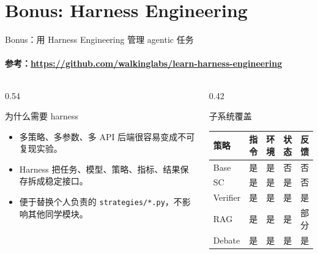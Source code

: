 \documentclass[10pt,aspectratio=169]{beamer}
\newcommand{\tightitems}{\setlength{\itemsep}{0.24em}}
\begin{document}
\section{Bonus: Harness Engineering}

\begin{frame}{Bonus：用 Harness Engineering 管理 agentic 任务}
  \framesubtitle{参考：\url{https://github.com/walkinglabs/learn-harness-engineering}}
  \begin{columns}[T,onlytextwidth]
    \begin{column}{0.54\textwidth}
      \begin{block}{为什么需要 harness}
        \begin{itemize}
          \tightitems
          \item 多策略、多参数、多 API 后端很容易变成不可复现实验。
          \item Harness 把任务、模型、策略、指标、结果保存拆成稳定接口。
          \item 便于替换个人负责的 \texttt{strategies/*.py}，不影响其他同学模块。
        \end{itemize}
      \end{block}
    \end{column}
    \begin{column}{0.42\textwidth}
      \begin{block}{子系统覆盖}
        \small
        \begin{tabular}{lcccc}
          \toprule
          策略 & 指令 & 环境 & 状态 & 反馈 \\
          \midrule
          Base & 是 & 是 & 否 & 否 \\
          SC & 是 & 是 & 是 & 否 \\
          Verifier & 是 & 是 & 是 & 是 \\
          RAG & 是 & 是 & 是 & 部分 \\
          Debate & 是 & 是 & 是 & 是 \\
          \bottomrule
        \end{tabular}
      \end{block}
    \end{column}
  \end{columns}
\end{frame}
\end{document}
